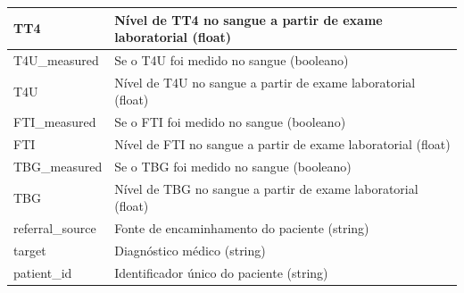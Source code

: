 \documentclass[11pt]{article}
\begin{document}
\begin{table}[H]
\begin{tabular}{|l|p{10cm}|}
TT4 & Nível de TT4 no sangue a partir de exame laboratorial (float) \\ \hline
T4U\_measured & Se o T4U foi medido no sangue (booleano) \\ \hline
T4U & Nível de T4U no sangue a partir de exame laboratorial (float) \\ \hline
FTI\_measured & Se o FTI foi medido no sangue (booleano) \\ \hline
FTI & Nível de FTI no sangue a partir de exame laboratorial (float) \\ \hline
TBG\_measured & Se o TBG foi medido no sangue (booleano) \\ \hline
TBG & Nível de TBG no sangue a partir de exame laboratorial (float) \\ \hline
referral\_source & Fonte de encaminhamento do paciente (string) \\ \hline
target & Diagnóstico médico (string) \\ \hline
patient\_id & Identificador único do paciente (string) \\ \hline
\end{tabular}
\end{table}
\end{document}
